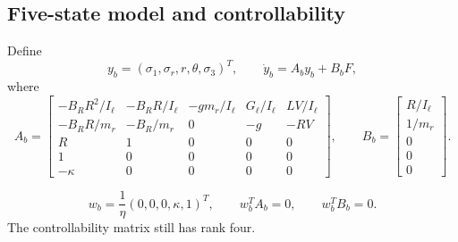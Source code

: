 \subsection{Five-state model and controllability}
Define
\begin{equation}
y_b=(\sigma_1,\sigma_r,r,\theta,\sigma_3)^T,\qquad
\dot y_b=A_b y_b+B_bF,
\end{equation}
where
\begin{equation}
A_b=\begin{bmatrix}
-B_RR^2/I_\ell&-B_RR/I_\ell&-gm_r/I_\ell&G_\ell/I_\ell&LV/I_\ell\\
-B_RR/m_r&-B_R/m_r&0&-g&-RV\\
R&1&0&0&0\\
1&0&0&0&0\\
-\kappa&0&0&0&0
\end{bmatrix},\qquad
B_b=\begin{bmatrix}R/I_\ell\\1/m_r\\0\\0\\0\end{bmatrix}.
\end{equation}

\begin{equation}
w_b=\frac{1}{\eta}(0,0,0,\kappa,1)^T,\qquad
w_b^TA_b=0,\qquad w_b^TB_b=0.
\end{equation}
The controllability matrix still has rank four.

